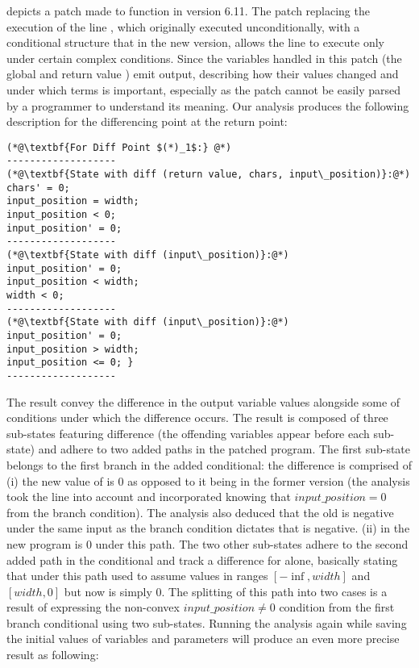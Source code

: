  depicts a patch made to  function in version 6.11. The patch replacing the execution of the line , which originally executed unconditionally, with a conditional structure that in the new version, allows the line to execute only under certain complex conditions. Since the variables handled in this patch (the global  and return value ) emit output, describing how their values changed and under which terms is important, especially as the patch cannot be easily parsed by a programmer to understand its meaning. Our analysis produces the following description for the differencing point at the return point:
\begin{lstlisting}
(*@\textbf{For Diff Point $(*)_1$:} @*)
-------------------
(*@\textbf{State with diff (return value, chars, input\_position)}:@*)
chars' = 0;
input_position = width;
input_position < 0;
input_position' = 0;
-------------------
(*@\textbf{State with diff (input\_position)}:@*)
input_position' = 0;
input_position < width;
width < 0;
-------------------
(*@\textbf{State with diff (input\_position)}:@*)
input_position' = 0;
input_position > width;
input_position <= 0; }
-------------------
\end{lstlisting}
The result convey the difference in the output variable values alongside some of conditions under which the difference occurs. The result is composed of three sub-states featuring difference (the offending variables appear before each sub-state) and adhere to two added paths in the patched program. The first sub-state belongs to the first branch in the added conditional: the difference is comprised of (i) the new value of  is 0 as opposed to it being  in the former version (the analysis took the  line into account and incorporated knowing that $input\_position = 0$ from the branch condition). The analysis also deduced that the old  is negative under the same input as the branch condition dictates that  is negative. (ii)  in the new program is 0 under this path. The two other sub-states adhere to the second added path in the conditional and track a difference for  alone, basically stating that  under this path used to assume values in ranges $[-\inf,width]$ and $[width,0]$ but now is simply 0. The splitting of this path into two cases is a result of expressing the non-convex $input\_position \neq 0$ condition from the first branch conditional using two sub-states. Running the analysis again while saving the initial values of variables and parameters will produce an even more precise result as following:

